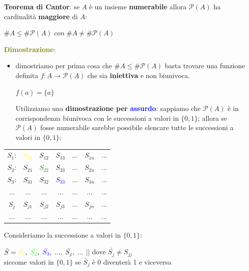 \textbf{Teorema di Cantor}: se $A$ è un insieme \textbf{numerabile} allora $\mathcal{P}(A)$ ha cardinalità \textbf{maggiore} di $A$:
\begin{center}
    $\#A \leq \#\mathcal{P}(A) \; con \; \#A \neq \#\mathcal{P}(A)$
\end{center}
\textcolor{olive}{\textbf{Dimostrazione}}: 
\begin{itemize}[nosep]
    \item dimostriamo per prima cosa che $\#A \leq \#\mathcal{P}(A)$ basta trovare una funzione definita $f : A \rightarrow \mathcal{P}(A)$ che sia \textbf{iniettiva} e non biunivoca.
    \begin{center}
        $f(a) = \{a\}$
    \end{center}
    Utilizziamo una \textbf{dimostrazione per} \textcolor{blue}{\textbf{assurdo}}: sappiamo che $\mathcal{P}(A)$ è in corrispondenza biunivoca con le successioni a valori in $\{0,1\}$; allora se $\mathcal{P}(A)$ fosse numerabile sarebbe possibile elencare tutte le successioni a valori in $\{0,1\}$:
\end{itemize}
\begin{center}
    \begin{tabular}{ccccccc}
        $S_1$: & \textcolor{yellow}{$S_{11}$} & $S_{12}$ & $S_{13}$ & ... & $S_{1n}$ & ... \\
        $S_2$: & $S_{21}$ & \textcolor{green}{$S_{22}$} & $S_{23}$ & ... & $S_{2n}$ & ... \\
        $S_3$: & $S_{31}$ & $S_{32}$ & \textcolor{blue}{$S_{33}$} & ... & $S_{3n}$ & ... \\
        ... & ... & ... & ... & ... & ... & ... \\
        $S_j$ & $S_{j1}$ & $S_{j2}$ & $S_{j3}$ & ... & $S_{jn}$ & ... \\
        ... & ... & ... & ... & ... & ... & ... \\
    \end{tabular}
\end{center}
Consideriamo la successione a valori in $\{0, 1\}$:

{\centering
    $\bar{S} = \textcolor{yellow}{\bar{S_1}}, \; \textcolor{green}{\bar{S_2}}, \; \textcolor{blue}{\bar{S_3}}, \; ..., \; \bar{S_j}, \; ...$ || dove $\bar{S_j} \neq S_{jj}$ \\
    siccome valori in $\{0,1\}$ se $\bar{S}_j$ è 0 diventerà 1 e viceversa
\par}

